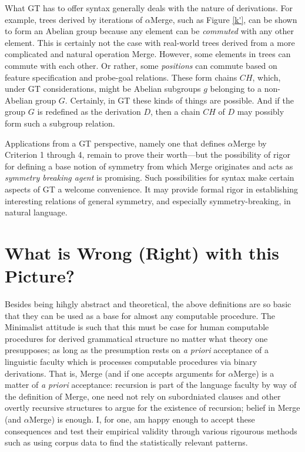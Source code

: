 \documentclass[11pt,twoside]{article}
\theoremstyle{plain}
\numberwithin{equation}{section}
\theoremstyle{definition}
\newtheorem{phrase string}{Phrase String}
\begin{document}
What GT has to offer syntax generally deals with the nature of derivations. For example, trees derived by iterations of $\alpha$Merge, such as Figure \ref{k'}, can be shown to form an Abelian group because any element can be \textsl{commuted} with any other element. This is certainly not the case with real-world trees derived from a more complicated and natural operation Merge. However, some elements in trees can commute with each other. Or rather, some \textsl{positions} can commute based on feature specification and probe-goal relations. These form chains $CH$, which, under GT considerations, might be Abelian subgroups $g$ belonging to a non-Abelian group $G$. Certainly, in GT these kinds of things are possible. And if the group $G$ is redefined as the derivation $D$, then a chain $CH$ of $D$ may possibly form such a subgroup relation.

Applications from a GT perspective, namely one that defines $\alpha$Merge by Criterion 1 through 4, remain to prove their worth---but the possibility of rigor for defining a base notion of symmetry from which Merge originates and acts as \textsl{symmetry breaking agent} is promising. Such possibilities for syntax make certain aspects of GT a welcome convenience. It may provide formal rigor in establishing interesting relations of general symmetry, and especially symmetry-breaking, in natural language.

\section*{What is Wrong (Right) with this Picture?}
Besides being hihgly abstract and theoretical, the above definitions are so basic that they can be used as a base for almost any computable procedure. The Minimalist attitude is such that this must be case for human computable procedures for derived grammatical structure no matter what theory one presupposes; as long as the presumption rests on \textsl{a priori} acceptance of a linguistic faculty which is processes computable procedures via binary derivations. That is, Merge (and if one accepts arguments for $\alpha$Merge) is a matter of \textsl{a priori} acceptance: recursion is part of the language faculty by way of the definition of Merge, one need not rely on subordniated clauses and other overtly recursive structures to argue for the existence of recursion; belief in Merge (and $\alpha$Merge) is enough. I, for one, am happy enough to accept these consequences and test their empirical validity through various rigourous methods such as using corpus data to find the statistically relevant patterns.
\end{document}
